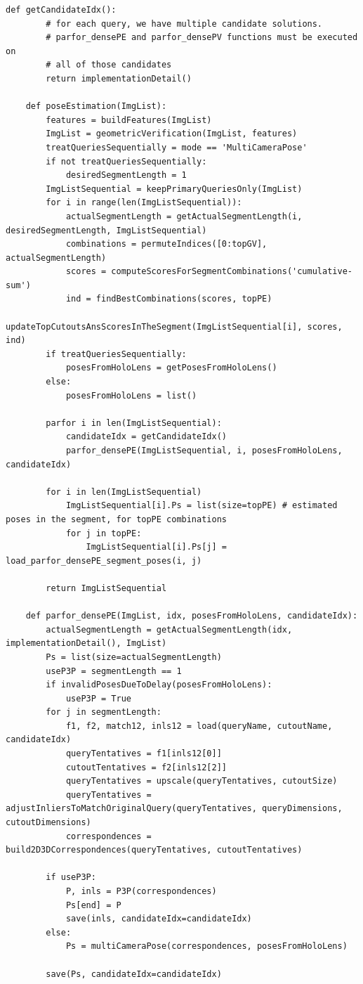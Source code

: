 \documentclass[twoside]{ctuthesis}
\theoremstyle{plain}
\theoremstyle{definition}
\theoremstyle{note}
\newcommand{\todo}[1][]{%
\ifthenelse{\isempty{#1}}{\textbf{TODO}}{\textbf{TODO: #1}}%
}
\begin{document}
\begin{lstlisting}[style=pseudocode, caption={InLocCIIRC pseudocode. \todo[pseudocode review.]}]
	def getCandidateIdx():
		# for each query, we have multiple candidate solutions.
		# parfor_densePE and parfor_densePV functions must be executed on
		# all of those candidates
		return implementationDetail()

	def poseEstimation(ImgList):
		features = buildFeatures(ImgList)
		ImgList = geometricVerification(ImgList, features)
		treatQueriesSequentially = mode == 'MultiCameraPose'
		if not treatQueriesSequentially:
			desiredSegmentLength = 1
		ImgListSequential = keepPrimaryQueriesOnly(ImgList)
		for i in range(len(ImgListSequential)):
			actualSegmentLength = getActualSegmentLength(i, desiredSegmentLength, ImgListSequential)
			combinations = permuteIndices([0:topGV], actualSegmentLength)
			scores = computeScoresForSegmentCombinations('cumulative-sum')
			ind = findBestCombinations(scores, topPE)
			updateTopCutoutsAnsScoresInTheSegment(ImgListSequential[i], scores, ind)
		if treatQueriesSequentially:
			posesFromHoloLens = getPosesFromHoloLens()
		else:
			posesFromHoloLens = list()

		parfor i in len(ImgListSequential):
			candidateIdx = getCandidateIdx()
			parfor_densePE(ImgListSequential, i, posesFromHoloLens, candidateIdx)

		for i in len(ImgListSequential)
			ImgListSequential[i].Ps = list(size=topPE) # estimated poses in the segment, for topPE combinations
			for j in topPE:
				ImgListSequential[i].Ps[j] = load_parfor_densePE_segment_poses(i, j)

		return ImgListSequential

	def parfor_densePE(ImgList, idx, posesFromHoloLens, candidateIdx):
		actualSegmentLength = getActualSegmentLength(idx, implementationDetail(), ImgList)
		Ps = list(size=actualSegmentLength)
		useP3P = segmentLength == 1
		if invalidPosesDueToDelay(posesFromHoloLens):
			useP3P = True
		for j in segmentLength:
			f1, f2, match12, inls12 = load(queryName, cutoutName, candidateIdx)
			queryTentatives = f1[inls12[0]]
			cutoutTentatives = f2[inls12[2]]
			queryTentatives = upscale(queryTentatives, cutoutSize)
			queryTentatives = adjustInliersToMatchOriginalQuery(queryTentatives, queryDimensions, cutoutDimensions)
			correspondences = build2D3DCorrespondences(queryTentatives, cutoutTentatives)

		if useP3P:
			P, inls = P3P(correspondences)
			Ps[end] = P
			save(inls, candidateIdx=candidateIdx)
		else:
			Ps = multiCameraPose(correspondences, posesFromHoloLens)

		save(Ps, candidateIdx=candidateIdx)


\end{lstlisting}
\end{document}
